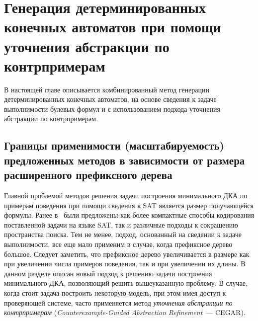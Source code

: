 
\chapter{Генерация детерминированных конечных автоматов при помощи уточнения абстракции по контрпримерам} 
\label{sec:cegar}

В настоящей главе описывается комбинированный метод генерации детерминированных конечных автоматов, на основе сведения к задаче выполнимости булевых формул и с использованием подхода уточнения абстракции по контрпримерам.

\section{Границы применимости (масштабируемость) предложенных методов в зависимости от размера расширенного префиксного дерева} %
\label{sec:cegar:motivation}


Главной проблемой методов решения задачи построения минимального ДКА по примерам поведения при помощи сведения к SAT является размер получающейся формулы.
Ранее в~\cite{zakirzyanov2015LATA,zakirzyanov2017DataMode,zakirzyanov2019LATA} были предложены как более компактные способы кодирования поставленной задачи на языке SAT, так и различные подходы к сокращению пространства поиска. 
Тем не менее, подход, основанный на сведении к задаче выполнимости, все еще мало применим в случае, когда префиксное дерево
большое. Следует заметить, что префиксное дерево увеличивается в размере как при увеличении числа примеров поведения, так и при увеличении их длины.
В данном разделе описан новый подход к решению задачи построения минимального ДКА, позволяющий решить вышеуказанную проблему.
В случае, когда стоит задача построить некоторую модель, при этом имея доступ к проверяющей системе, часто применяется метод \emph{уточнения абстракции по контрпримерам} (\emph{Counterexample-Guided Abstraction Refinement}~--- CEGAR). 


